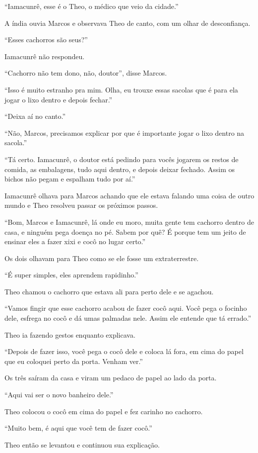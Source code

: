 ``Iamacunrê, esse é o Theo, o médico que veio da cidade.''

A índia ouvia Marcos e observava Theo de canto, com um olhar de
desconfiança.

``Esses cachorros são seus?''

Iamacunrê não respondeu.

``Cachorro não tem dono, não, doutor'', disse Marcos.

``Isso é muito estranho pra mim. Olha, eu trouxe essas sacolas que é
para ela jogar o lixo dentro e depois fechar.''

``Deixa aí no canto.''

``Não, Marcos, precisamos explicar por que é importante jogar o lixo
dentro na sacola.''

``Tá certo. Iamacunrê, o doutor está pedindo para vocês jogarem os
restos de comida, as embalagens, tudo aqui dentro, e depois deixar
fechado. Assim os bichos não pegam e espalham tudo por aí.''

Iamacunrê olhava para Marcos achando que ele estava falando uma coisa de
outro mundo e Theo resolveu passar os próximos passos.

``Bom, Marcos e Iamacunrê, lá onde eu moro, muita gente tem cachorro
dentro de casa, e ninguém pega doença no pé. Sabem por quê? É porque tem
um jeito de ensinar eles a fazer xixi e cocô no lugar certo.''

Os dois olhavam para Theo como se ele fosse um extraterrestre.

``É super simples, eles aprendem rapidinho.''

Theo chamou o cachorro que estava ali para perto dele e se agachou.

``Vamos fingir que esse cachorro acabou de fazer cocô aqui. Você pega o
focinho dele, esfrega no cocô e dá umas palmadas nele. Assim ele entende
que tá errado.''

Theo ia fazendo gestos enquanto explicava.

``Depois de fazer isso, você pega o cocô dele e coloca lá fora, em cima
do papel que eu coloquei perto da porta. Venham ver.''

Os três saíram da casa e viram um pedaco de papel ao lado da porta.

``Aqui vai ser o novo banheiro dele.''

Theo colocou o cocô em cima do papel e fez carinho no cachorro.

``Muito bem, é aqui que você tem de fazer cocô.''

Theo então se levantou e continuou sua explicação.

